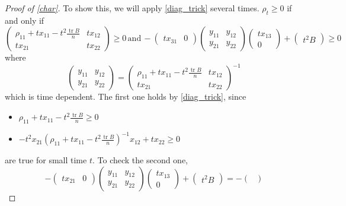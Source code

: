 \documentclass[11pt,reqno]{amsart}
\theoremstyle{definition}
\newcommand{\lpara}{\left(}
\newcommand{\rpara}{\right)}
\newcommand{\inv}{^{-1}}
\DeclareMathOperator{\tr}{tr}
\begin{document}
\begin{proof}[Proof of \cref{char}]
    To show this, we will apply \cref{diag_trick} several times. $\rho_t \geq 0$ if and only if 
    $$\begin{pmatrix}
           \rho_{11}+tx_{11}-t^2\frac{\tr B}{n} & tx_{12}\\
           tx_{21} & tx_{22} 
        \end{pmatrix}\geq 0\,\text{and}\,
        -\begin{pmatrix}
            tx_{31} & 0
        \end{pmatrix}\begin{pmatrix}
            y_{11} & y_{12}\\
            y_{21} & y_{22}
        \end{pmatrix}\begin{pmatrix}
            tx_{13}\\0
        \end{pmatrix}+\begin{pmatrix}
            t^2B
        \end{pmatrix}\geq 0$$
    where $$\begin{pmatrix}
        y_{11} & y_{12}\\
        y_{21} & y_{22}
    \end{pmatrix}=\begin{pmatrix}
        \rho_{11}+tx_{11}-t^2\frac{\tr B}{n} & tx_{12}\\
        tx_{21} & tx_{22} 
    \end{pmatrix}\inv$$ which is time dependent. The first one holds by \cref{diag_trick}, since 
    \begin{itemize}
        \item $\rho_{11}+tx_{11}-t^2\frac{\tr B}{n}\geq 0$
        \item $-t^2x_{21}\lpara \rho_{11}+tx_{11}-t^2\frac{\tr B}{n}\rpara\inv x_{12}+tx_{22}\geq 0$
    \end{itemize}
    are true for small time $t$. To check the second one, 
    $$-\begin{pmatrix}
        tx_{21} & 0
    \end{pmatrix}\begin{pmatrix}
        y_{11} & y_{12}\\
        y_{21} & y_{22}
    \end{pmatrix}\begin{pmatrix}
        tx_{13}\\0
    \end{pmatrix}+\begin{pmatrix}
        t^2B
    \end{pmatrix}=-\begin{pmatrix}

\end{pmatrix}$$
\end{proof}
\end{document}

